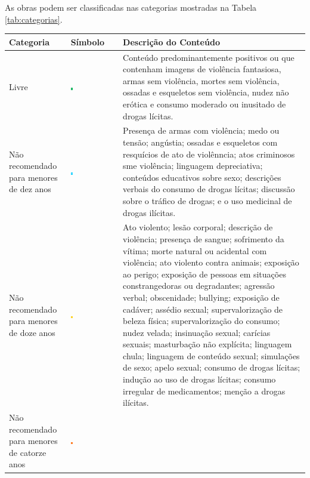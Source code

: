 As obras podem ser classificadas nas categorias mostradas na Tabela \ref{tab:categorias}.
\begin{table}[h!]
	\centering
	\begin{tabular}{p{3cm} p{2cm} p{9cm}}
		\hline
		Categoria & Símbolo & Descrição do Conteúdo \\
		\hline
		Livre & \includegraphics[width=0.05\textwidth]{img/livre.png} &
				Conteúdo predominantemente positivos ou que contenham imagens de violência fantasiosa, armas sem violência, mortes sem violência, ossadas e esqueletos sem violência, nudez não erótica e consumo moderado ou inusitado de drogas lícitas. \\
		\hline
		Não recomendado para menores de dez anos & \includegraphics[width=0.05\textwidth]{img/10anos.png} &
		 		Presença de armas com violência; medo ou tensão; angústia; ossadas e esqueletos com resquícios de ato de violênncia; atos criminosos sme violência; linguagem depreciativa; conteúdos educativos sobre sexo; descrições verbais do consumo de drogas lícitas; discussão sobre o tráfico de drogas; e o uso medicinal de drogas ilícitas.\\
		\hline
		Não recomendado para menores de doze anos & \includegraphics[width=0.05\textwidth]{img/12anos.png} &
				Ato violento; lesão corporal; descrição de violência; presença de sangue; sofrimento da vítima; morte natural ou acidental com violência; ato violento contra animais; exposição ao perigo; exposição de pessoas em situações constrangedoras ou degradantes; agressão verbal; obscenidade; bullying; exposição de cadáver; assédio sexual; supervalorização de beleza física; supervalorização do consumo; nudez velada; insinuação sexual; carícias sexuais; masturbação não explícita; linguagem chula; linguagem de conteúdo sexual; simulações de sexo; apelo sexual; consumo de drogas lícitas; indução ao uso de drogas lícitas; consumo irregular de medicamentos; menção a drogas ilícitas.\\
		\hline
		Não recomendado para menores de catorze anos & \includegraphics[width=0.05\textwidth]{img/14anos.png} &

\end{tabular}
\end{table}
